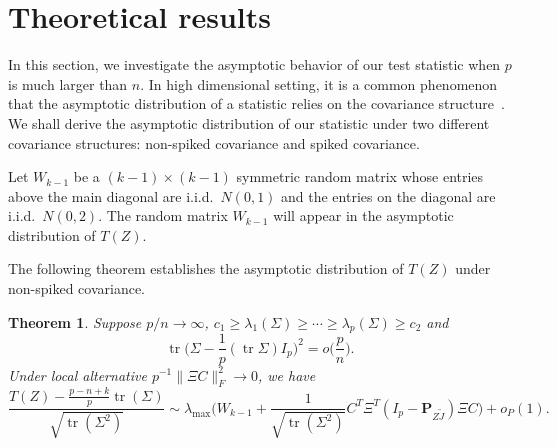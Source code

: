 \documentclass[12pt]{article} %
\DeclareMathOperator{\mytr}{tr}
\newcommand{\bP}{\mathbf{P}}
\newtheorem{theorem}{Theorem}
\theoremstyle{definition}
\begin{document}
   
   
   










\section{Theoretical results}

In this section, we investigate the asymptotic behavior of our test statistic when $p$ is much larger than $n$.
In high dimensional setting, it is a common phenomenon that the asymptotic distribution of a statistic relies on the covariance structure~\citep{Ma2015A}.
We shall derive the asymptotic distribution of our statistic under two different covariance structures: non-spiked covariance and spiked covariance.

Let $W_{k-1}$ be a $(k-1)\times(k-1)$ symmetric random matrix whose entries above the main diagonal are i.i.d.\ $N(0,1)$ and the entries on the diagonal are i.i.d.\ $N(0,2)$.
The random matrix $W_{k-1}$ will appear in the asymptotic distribution of $T(Z)$.

The following theorem establishes the asymptotic distribution of $T(Z)$ under non-spiked covariance.
\begin{theorem}\label{nonSpiked}
    Suppose $p/n\to \infty$, $c_1\geq \lambda_1(\Sigma)\geq \cdots\geq \lambda_p(\Sigma)\geq c_2$ and
    $$
    \mytr\Big(\Sigma-\frac{1}{p}(\mytr\Sigma)I_p\Big)^2=o\big(\frac{p}{n}\big).
    $$
    Under local alternative $p^{-1}\|\Xi C\|_F^2\to 0$,
    we have
    $$
    \frac{T(Z)-\frac{p-n+k}{p}\mytr(\Sigma)}{\sqrt{\mytr(\Sigma^2)}}
    \sim
    \lambda_{\max}\Big( W_{k-1} +\frac{1}{\sqrt{\mytr(\Sigma^2)}} C^T \Xi^T (I_p-\bP_{Z\tilde{J}})\Xi C\Big)+o_P(1).
    $$
\end{theorem}
\end{document}
